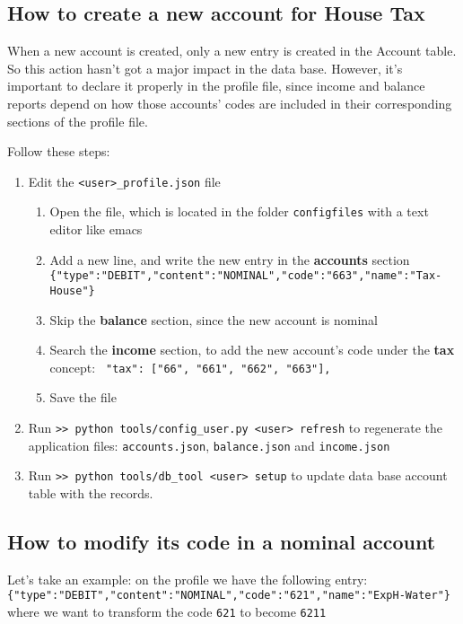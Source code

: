 \documentclass[12pt, a4paper]{article}
\begin{document}
 
 \subsection{How to create a new account for House Tax}  
 When a new account is created, only a new entry is created in the Account table. 
 So this action hasn't got a major impact in the data base. 
 However, it's important to declare it properly in the profile file, since income and balance reports depend on how those accounts' codes are included in their corresponding sections of the profile file. 
 
 Follow these steps:
 \begin{enumerate}
 \item Edit the \verb!<user>_profile.json! file
 \begin{enumerate}
 \item Open the file, which is located in the folder \verb!configfiles! with a text editor like \textsf{emacs}
 \item Add a new line, and  write the new entry in the \textbf{accounts} section\\ 
 	\verb!{"type":"DEBIT","content":"NOMINAL","code":"663","name":"Tax-House"}!
\item Skip the \textbf{balance} section, since the new account is  nominal
\item Search the \textbf{income} section, to add the new account's code under the \textbf{tax} concept:
	\verb! "tax": ["66", "661", "662", "663"], ! 
\item Save the file
\end{enumerate}
\item Run \verb!>> python tools/config_user.py <user> refresh! to regenerate the application files: \verb!accounts.json!, \verb!balance.json! and \verb!income.json! 
\item Run \verb!>> python tools/db_tool <user> setup! to  update data base account table with the records. 
 \end{enumerate}
 

\subsection{How to modify its code in a nominal account}  \label{NOMINAL_CODE}
Let's take an example: on the profile we have the following entry:\\
\verb!{"type":"DEBIT","content":"NOMINAL","code":"621","name":"ExpH-Water"}!
where we want to transform the code \verb!621! to become \verb!6211!
\end{document}
